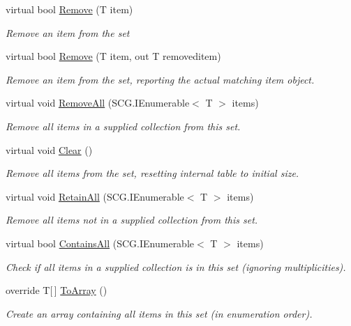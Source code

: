 \begin{DoxyCompactItemize}
virtual bool \hyperlink{class_c5_1_1_hash_set_ac9b5cd955239472a848788ce53345853}{Remove} (T item)
\begin{DoxyCompactList}\small\item\em Remove an item from the set \end{DoxyCompactList}\item 
virtual bool \hyperlink{class_c5_1_1_hash_set_a7e97b49057ee44abddb8fbd83b56b78a}{Remove} (T item, out T removeditem)
\begin{DoxyCompactList}\small\item\em Remove an item from the set, reporting the actual matching item object. \end{DoxyCompactList}\item 
virtual void \hyperlink{class_c5_1_1_hash_set_afc71edbb94b37e74b25d0d489c36dc3b}{Remove\+All} (S\+C\+G.\+I\+Enumerable$<$ T $>$ items)
\begin{DoxyCompactList}\small\item\em Remove all items in a supplied collection from this set. \end{DoxyCompactList}\item 
virtual void \hyperlink{class_c5_1_1_hash_set_a7bc97cd3a07e8e829c16e169ac71a075}{Clear} ()
\begin{DoxyCompactList}\small\item\em Remove all items from the set, resetting internal table to initial size. \end{DoxyCompactList}\item 
virtual void \hyperlink{class_c5_1_1_hash_set_a5ab8110d40df588e0214b2d55eb085ce}{Retain\+All} (S\+C\+G.\+I\+Enumerable$<$ T $>$ items)
\begin{DoxyCompactList}\small\item\em Remove all items {\itshape not} in a supplied collection from this set. \end{DoxyCompactList}\item 
virtual bool \hyperlink{class_c5_1_1_hash_set_ad7c29ad00f9697d4a07e03986c84770e}{Contains\+All} (S\+C\+G.\+I\+Enumerable$<$ T $>$ items)
\begin{DoxyCompactList}\small\item\em Check if all items in a supplied collection is in this set (ignoring multiplicities). \end{DoxyCompactList}\item 
override T\mbox{[}$\,$\mbox{]} \hyperlink{class_c5_1_1_hash_set_ad6e22ebc64d9f8c96b805547d5873023}{To\+Array} ()
\begin{DoxyCompactList}\small\item\em Create an array containing all items in this set (in enumeration order). \end{DoxyCompactList}\item 

\end{DoxyCompactItemize}
